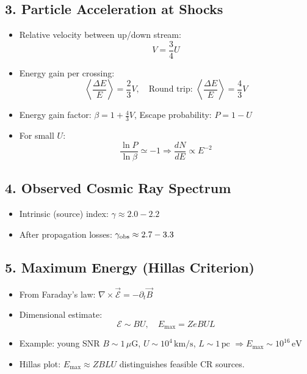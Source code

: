 \documentclass{sciposter}
\begin{document}
\begin{multicols}{3}
\subsection*{3. Particle Acceleration at Shocks}
\begin{itemize}
    \item Relative velocity between up/down stream:
    \[
        V = \frac{3}{4}U
    \]
    \item Energy gain per crossing:
    \[
        \left\langle \frac{\Delta E}{E} \right\rangle = \frac{2}{3}V, 
        \quad \text{Round trip: } \left\langle \frac{\Delta E}{E} \right\rangle = \frac{4}{3}V
    \]
    \item Energy gain factor: $\beta = 1 + \tfrac{4}{3}V$,  
          Escape probability: $P = 1 - U$
    \item For small $U$:
    \[
        \frac{\ln P}{\ln \beta} \simeq -1 \Rightarrow 
        \frac{dN}{dE} \propto E^{-2}
    \]
\end{itemize}

\subsection*{4. Observed Cosmic Ray Spectrum}
\begin{itemize}
    \item Intrinsic (source) index: $\gamma \approx 2.0 - 2.2$
    \item After propagation losses: $\gamma_{\rm obs} \approx 2.7 - 3.3$
\end{itemize}

\subsection*{5. Maximum Energy (Hillas Criterion)}
\begin{itemize}
    \item From Faraday’s law: $\nabla \times \vec{\mathcal{E}} = -\partial_t \vec{B}$
    \item Dimensional estimate:
    \[
        \mathcal{E} \sim BU, \quad E_{\max} = Z e B U L
    \]
    \item Example: young SNR  
    $B \sim 1\,\mu\mathrm{G}$, $U \sim 10^4\,\mathrm{km/s}$, $L \sim 1\,\mathrm{pc}$  
    $\Rightarrow E_{\max} \sim 10^{16}\,\mathrm{eV}$
    \item Hillas plot: $E_{\max} \approx Z B L U$ distinguishes feasible CR sources.
\end{itemize}


\end{multicols}
\end{document}
